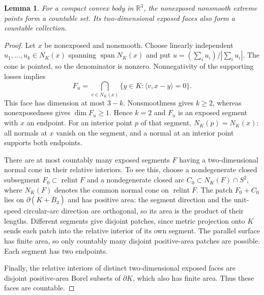 \documentclass[11pt,letterpaper]{amsart}
\newtheorem{lemma}[theorem]{Lemma}
\theoremstyle{definition}
\theoremstyle{remark}
\numberwithin{equation}{section}
\DeclareMathOperator{\relint}{relint}
\begin{document}
\begin{lemma}\label{lem:countable}
For a compact convex body in $\mathbb R^3$, the nonexposed nonsmooth
extreme points form a countable set. Its two-dimensional exposed faces
also form a countable collection.
\end{lemma}
\begin{proof}
Let $x$ be nonexposed and nonsmooth. Choose linearly independent
$u_1,\ldots,u_k\in N_K(x)$ spanning $\operatorname{span}N_K(x)$ and put
$u=(\sum_i u_i)/|\sum_i u_i|$. The cone is pointed, so the
denominator is nonzero.
Nonnegativity of the supporting losses implies
\[
F_u=\bigcap_{v\in N_K(x)}\{y\in K:\langle v,x-y\rangle=0\}.
\]
This face has dimension at most $3-k$. Nonsmoothness gives $k\ge2$,
whereas nonexposedness gives $\dim F_u\ge1$. Hence $k=2$ and $F_u$
is an exposed segment with $x$ an endpoint. For an interior point $p$
of that segment, $N_K(p)=N_K(x)$: all normals at $x$ vanish on the segment,
and a normal at an interior point supports both endpoints.

There are at most countably many exposed segments $F$ having a
two-dimensional normal cone in their relative interiors. To see this,
choose a nondegenerate closed subsegment $F_0\subset\relint F$ and a
nondegenerate closed arc $C_0\subset N_K(F)\cap S^2$, where
$N_K(F)$ denotes the common normal cone on $\relint F$. The patch
$F_0+C_0$ lies on $\partial(K+\overline B_3)$ and has positive area:
the segment direction and the unit-speed circular-arc direction are
orthogonal, so its area is the product of their lengths. Different
segments give disjoint patches, since metric projection onto $K$ sends
each patch into the relative interior of its own segment. The parallel
surface has finite area, so only countably many disjoint positive-area
patches are possible. Each segment has two endpoints.

Finally, the relative interiors of distinct two-dimensional exposed faces
are disjoint positive-area Borel subsets of $\partial K$, which also has
finite area. Thus these faces are countable.
\end{proof}
\end{document}
